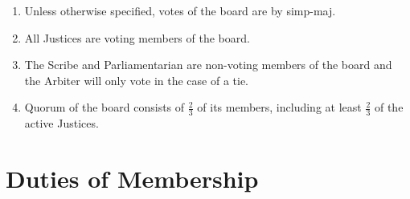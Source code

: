 	\begin{enumerate}
		\item Unless otherwise specified, votes of the board are by \gls{simp-maj}.
		\item All Justices are voting members of the board.
		\item The Scribe and Parliamentarian are non-voting members of the board and the Arbiter will only vote in the case of a tie.
		\item Quorum of the board consists of $\frac{2}{3}$ of its members, including at least $\frac{2}{3}$ of the active Justices.
	\end{enumerate}

\section{Duties of Membership}

